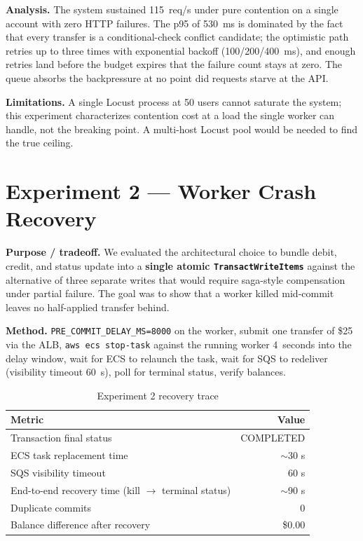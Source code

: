 \documentclass[10pt,a4paper]{article}
\begin{document}
\begin{analysisbox}
\textbf{Analysis.} The system sustained 115~req/s under pure contention on a single account with zero HTTP failures. The p95 of 530~ms is dominated by the fact that every transfer is a conditional-check conflict candidate; the optimistic path retries up to three times with exponential backoff (100/200/400~ms), and enough retries land before the budget expires that the failure count stays at zero. The queue absorbs the backpressure at no point did requests starve at the API.
\end{analysisbox}

\begin{limitbox}
\textbf{Limitations.} A single Locust process at 50 users cannot saturate the system; this experiment characterizes contention cost at a load the single worker can handle, not the breaking point. A multi-host Locust pool would be needed to find the true ceiling.
\end{limitbox}

\section{Experiment 2 --- Worker Crash Recovery}

\begin{purposebox}
\textbf{Purpose / tradeoff.} We evaluated the architectural choice to bundle debit, credit, and status update into a \textbf{single atomic \texttt{TransactWriteItems}} against the alternative of three separate writes that would require saga-style compensation under partial failure. The goal was to show that a worker killed mid-commit leaves no half-applied transfer behind.
\end{purposebox}

\textbf{Method.} \texttt{PRE\_COMMIT\_DELAY\_MS=8000} on the worker, submit one transfer of \$25 via the ALB, \texttt{aws ecs stop-task} against the running worker 4~seconds into the delay window, wait for ECS to relaunch the task, wait for SQS to redeliver (visibility timeout 60~s), poll for terminal status, verify balances.

\begin{table}[H]
\centering
\small
\caption{Experiment 2 recovery trace}
\begin{tabular}{lr}
\toprule
\textbf{Metric} & \textbf{Value} \\
\midrule
Transaction final status & COMPLETED \\
ECS task replacement time & $\sim$30 s \\
SQS visibility timeout & 60 s \\
End-to-end recovery time (kill $\rightarrow$ terminal status) & $\sim$90 s \\
Duplicate commits & 0 \\
Balance difference after recovery & \$0.00 \\
\bottomrule
\end{tabular}
\end{table}
\end{document}
